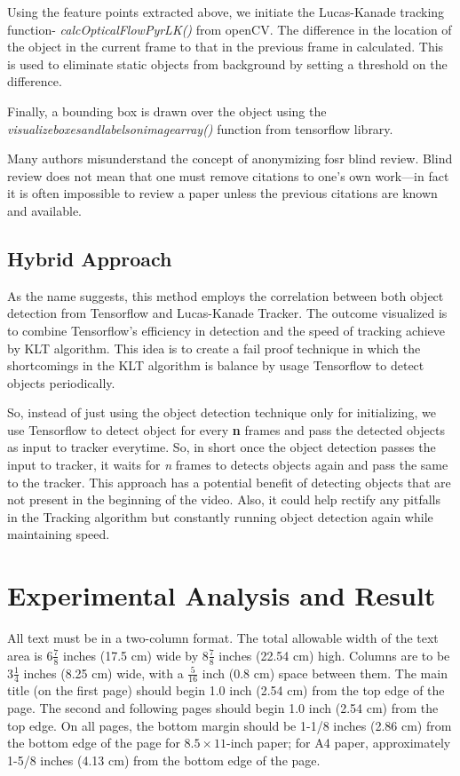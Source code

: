 \documentclass[10pt,twocolumn,letterpaper]{article}
\begin{document}
Using the feature points extracted above, we initiate the Lucas-Kanade tracking function- \textit{calcOpticalFlowPyrLK()} from openCV. The difference in the location of the object in the current frame to that in the previous frame in calculated. This is used to eliminate static objects from background by setting a threshold on the difference. 

Finally, a bounding box is drawn over the object using the \textit{visualize\textunderscore boxes\textunderscore and\textunderscore labels\textunderscore on\textunderscore image\textunderscore array()}  function from tensorflow library.

Many authors misunderstand the concept of anonymizing fosr blind
review.  Blind review does not mean that one must remove
citations to one's own work---in fact it is often impossible to
review a paper unless the previous citations are known and
available.

\subsection{Hybrid Approach}
As the name suggests, this method employs the correlation between both object detection from Tensorflow and Lucas-Kanade Tracker. The outcome visualized is to combine Tensorflow's efficiency in detection and the speed of tracking achieve by KLT algorithm. This idea is to create a fail proof technique in which the shortcomings in the KLT algorithm is balance by usage Tensorflow to detect objects periodically.

So, instead of just using the object detection technique only for initializing, we use Tensorflow to detect object for every \textbf{n} frames and pass the detected objects as input to tracker everytime. So, in short once the object detection passes the input to tracker, it waits for \textit{n} frames to detects objects again and pass the same to the tracker. This approach has a potential benefit of detecting objects that are not present in the beginning of the video. Also, it could help rectify any pitfalls in the Tracking algorithm but constantly running object detection again while maintaining speed.

\section{Experimental Analysis and Result}

All text must be in a two-column format. The total allowable width of the
text area is $6\frac78$ inches (17.5 cm) wide by $8\frac78$ inches (22.54
cm) high. Columns are to be $3\frac14$ inches (8.25 cm) wide, with a
$\frac{5}{16}$ inch (0.8 cm) space between them. The main title (on the
first page) should begin 1.0 inch (2.54 cm) from the top edge of the
page. The second and following pages should begin 1.0 inch (2.54 cm) from
the top edge. On all pages, the bottom margin should be 1-1/8 inches (2.86
cm) from the bottom edge of the page for $8.5 \times 11$-inch paper; for A4
paper, approximately 1-5/8 inches (4.13 cm) from the bottom edge of the
page.
\end{document}
